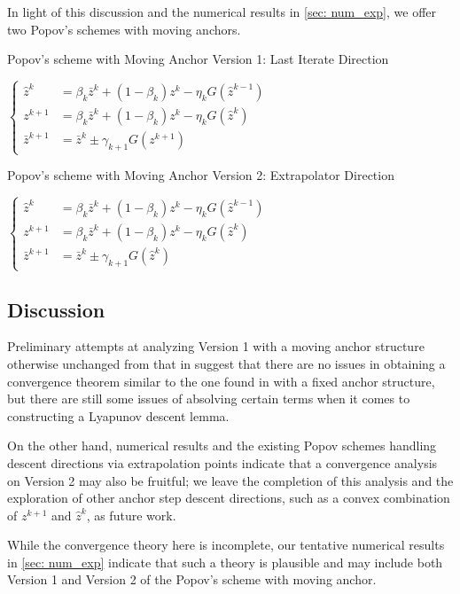 \documentclass[11pt,reqno,oneside]{amsart}
\theoremstyle{definition}
\numberwithin{equation}{section}
\begin{document}
In light of this discussion and the numerical results in \cref{sec: num_exp}, we offer two Popov's schemes with moving anchors.


Popov's scheme with Moving Anchor Version 1: Last Iterate Direction

$\begin{cases}
    \hat{z}^{k} &= \beta_{k}\bar{z}^{k} + (1 - \beta_{k})z^{k} - \eta_{k}G(\hat{z}^{k-1}) \\
    z^{k+1} &= \beta_{k}\bar{z}^{k} + (1 - \beta_{k})z^{k} - \eta_{k}G(\hat{z}^{k}) \label{version_1}\\
    \bar{z}^{k+1} &= \bar{z}^{k} \pm \gamma_{k+1}G(z^{k+1})
\end{cases}$

Popov's scheme with Moving Anchor Version 2: Extrapolator Direction

$\begin{cases}
    \hat{z}^{k} &= \beta_{k}\bar{z}^{k} + (1 - \beta_{k})z^{k} - \eta_{k}G(\hat{z}^{k-1}) \\
    z^{k+1} &= \beta_{k}\bar{z}^{k} + (1 - \beta_{k})z^{k} - \eta_{k}G(\hat{z}^{k}) \label{version_2}\\
    \bar{z}^{k+1} &= \bar{z}^{k} \pm \gamma_{k+1}G(\hat{z}^{k})
\end{cases}$

\subsection{Discussion}

Preliminary attempts at analyzing Version 1 with a moving anchor structure otherwise unchanged from that in \cite{alcala2023moving} suggest that there are no issues in obtaining a convergence theorem similar to the one found in \cite{tran2021halpern} with a fixed anchor structure, but there are still some issues of absolving certain terms when it comes to constructing a Lyapunov descent lemma.

On the other hand, numerical results and the existing Popov schemes handling descent directions via extrapolation points indicate that a convergence analysis on Version 2 may also be fruitful; we leave the completion of this analysis and the exploration of other anchor step descent directions, such as a convex combination of $z^{k+1}$ and $\hat{z}^{k}$, as future work.

While the convergence theory here is incomplete, our tentative numerical results in \cref{sec: num_exp} indicate that such a theory is plausible and may include both Version 1 and Version 2 of the Popov's scheme with moving anchor.
\end{document}

